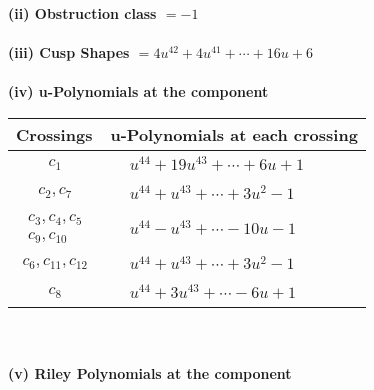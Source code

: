 \documentclass[1p]{elsarticle_modified}
\theoremstyle{definition}
\begin{document}
\flushleft \textbf{(ii) Obstruction class $= -1$}\\~\\
\flushleft \textbf{(iii) Cusp Shapes $= 4 u^{42}+4 u^{41}+\cdots+16 u+6$}\\~\\
\newpage\renewcommand{\arraystretch}{1}
\flushleft \textbf{(iv) u-Polynomials at the component}\newline \\
\begin{tabular}{m{50pt}|m{274pt}}
Crossings & \hspace{64pt}u-Polynomials at each crossing \\
\hline $$\begin{aligned}c_{1}\end{aligned}$$&$\begin{aligned}
&u^{44}+19 u^{43}+\cdots+6 u+1
\end{aligned}$\\
\hline $$\begin{aligned}c_{2},c_{7}\end{aligned}$$&$\begin{aligned}
&u^{44}+u^{43}+\cdots+3 u^2-1
\end{aligned}$\\
\hline $$\begin{aligned}c_{3},c_{4},c_{5}\\c_{9},c_{10}\end{aligned}$$&$\begin{aligned}
&u^{44}- u^{43}+\cdots-10 u-1
\end{aligned}$\\
\hline $$\begin{aligned}c_{6},c_{11},c_{12}\end{aligned}$$&$\begin{aligned}
&u^{44}+u^{43}+\cdots+3 u^2-1
\end{aligned}$\\
\hline $$\begin{aligned}c_{8}\end{aligned}$$&$\begin{aligned}
&u^{44}+3 u^{43}+\cdots-6 u+1
\end{aligned}$\\
\hline
\end{tabular}\\~\\
\newpage\renewcommand{\arraystretch}{1}
\flushleft \textbf{(v) Riley Polynomials at the component}\newline \\
\end{document}
